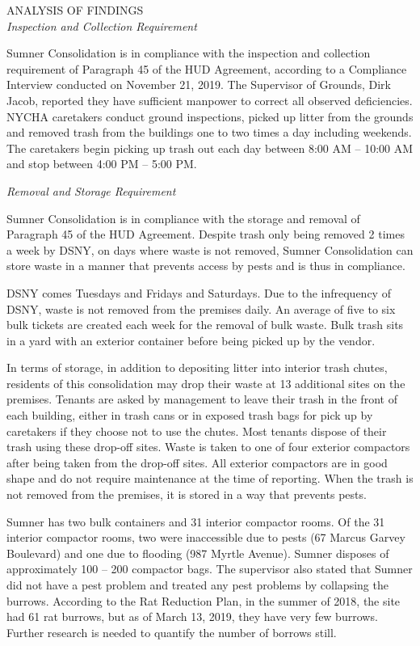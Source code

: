 \pagebreak
\pagestyle{plain}
\pagecolor{ccgreen}
\pagebreak
{}
\pagestyle{fancy}
\fancyhf{}
\renewcommand{\chaptermark}[1]{\markboth{#1}{}}
\fancyfoot[LE,RO]{\thepage}
\textcolor{ccgreen}{ANALYSIS OF FINDINGS}
\\
\emph{Inspection and Collection Requirement}

Sumner Consolidation is in compliance with the inspection and collection requirement of  Paragraph 45 of the HUD Agreement, according to a Compliance Interview conducted on November 21, 2019. The Supervisor of Grounds, Dirk Jacob, reported they have sufficient manpower to correct all observed deficiencies. NYCHA caretakers conduct ground inspections, picked up litter from the grounds and removed trash from the buildings one to two times a day including weekends. The caretakers begin picking up trash out each day between 8:00 AM -- 10:00 AM and stop between 4:00 PM -- 5:00 PM.  

\emph{Removal and Storage Requirement}

Sumner Consolidation is in compliance with the storage and removal of Paragraph 45 of the HUD Agreement. Despite trash only being removed 2 times a week by DSNY, on days where waste is not removed, Sumner Consolidation can store waste in a manner that prevents access by pests and is thus in compliance.  

DSNY comes Tuesdays and Fridays and Saturdays. Due to the infrequency of DSNY, waste is not removed from the premises daily. An average of five to six bulk tickets are created each week for the removal of bulk waste. Bulk trash sits in a yard with an exterior container before being picked up by the vendor. 

In terms of storage, in addition to depositing litter into interior trash chutes, residents of this consolidation may drop their waste at 13 additional sites on the premises. Tenants are asked by management to leave their trash in the front of each building, either in trash cans or in exposed trash bags for pick up by caretakers if they choose not to use the chutes. Most tenants dispose of their trash using these drop-off sites. Waste is taken to one of four exterior compactors after being taken from the drop-off sites. All exterior compactors are in good shape and do not require maintenance at the time of reporting. When the trash is not removed from the premises, it is stored in a way that prevents pests. 

Sumner has two bulk containers and 31 interior compactor rooms. Of the 31 interior compactor rooms, two were inaccessible due to pests (67 Marcus Garvey Boulevard) and one due to flooding (987 Myrtle Avenue). Sumner disposes of approximately 100 -- 200 compactor bags. The supervisor also stated that Sumner did not have a pest problem and treated any pest problems by collapsing the burrows. According to the Rat Reduction Plan, in the summer of 2018, the site had 61 rat burrows, but as of March 13, 2019, they have very few burrows. Further research is needed to quantify the number of borrows still. 

